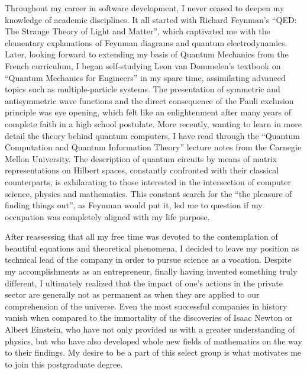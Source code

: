 \documentclass[10pt]{article}
\begin{document}
Throughout my career in software development, I never ceased to deepen my knowledge of academic disciplines. It all started with Richard Feynman's ``QED: The Strange Theory of Light and Matter'', which captivated me with the elementary explanations of Feynman diagrams and quantum electrodynamics. Later, looking forward to extending my basis of Quantum Mechanics from the French curriculum, I began self-studying Leon van Dommelen's textbook on ``Quantum Mechanics for Engineers'' in my spare time, assimilating advanced topics such as multiple-particle systems. The presentation of symmetric and antisymmetric wave functions and the direct consequence of the Pauli exclusion principle was eye opening, which felt like an enlightenment after many years of complete faith in a high school postulate. More recently, wanting to learn in more detail the theory behind quantum computers, I have read through the ``Quantum Computation and Quantum Information Theory'' lecture notes from the Carnegie Mellon University. The description of quantum circuits by means of matrix representations on Hilbert spaces, constantly confronted with their classical counterparts, is exhilarating to those interested in the intersection of computer science, physics and mathematics. This constant search for the ``the pleasure of finding things out'', as Feynman would put it, led me to question if my occupation was completely aligned with my life purpose.

After reassessing that all my free time was devoted to the contemplation of beautiful equations and theoretical phenomena, I decided to leave my position as technical lead of the company in order to pursue science as a vocation. Despite my accomplishments as an entrepreneur, finally having invented something truly different, I ultimately realized that the impact of one's actions in the private sector are generally not as permanent as when they are applied to our comprehension of the universe. Even the most successful companies in history vanish when compared to the immortality of the discoveries of Isaac Newton or Albert Einstein, who have not only provided us with a greater understanding of physics, but who have also developed whole new fields of mathematics on the way to their findings. My desire to be a part of this select group is what motivates me to join this postgraduate degree.
\end{document}
